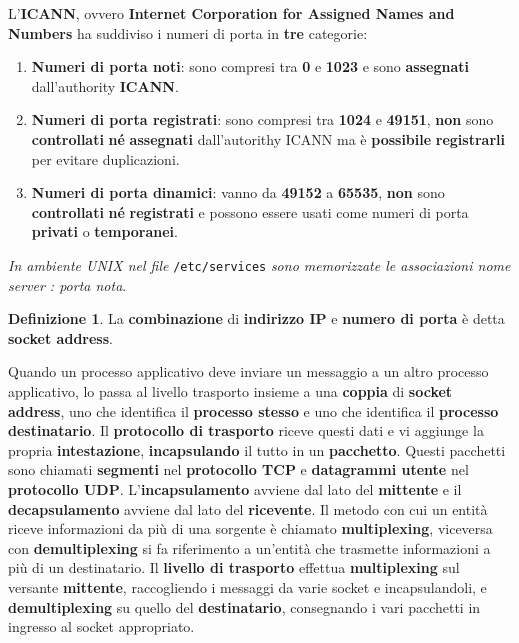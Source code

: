 \documentclass[11pt,a4paper,oneside]{book}
\theoremstyle{definition}
\newtheorem{definition}{Definizione}[section]
\begin{document}
\pagebreak

L'\textbf{ICANN}, ovvero \textbf{Internet Corporation for Assigned Names and Numbers} ha suddiviso i numeri di porta in \textbf{tre} categorie:
\begin{enumerate}
	\item \textbf{Numeri di porta noti}: sono compresi tra \textbf{0} e \textbf{1023} e sono \textbf{assegnati} dall'authority \textbf{ICANN}.
	\item \textbf{Numeri di porta registrati}: sono compresi tra \textbf{1024} e \textbf{49151}, \textbf{non} sono \textbf{controllati} \textbf{né} \textbf{assegnati} dall'autorithy ICANN ma è \textbf{possibile} \textbf{registrarli} per evitare duplicazioni.
	\item \textbf{Numeri di porta dinamici}: vanno da \textbf{49152} a \textbf{65535}, \textbf{non} sono \textbf{controllati} \textbf{né} \textbf{registrati} e possono essere usati come numeri di porta \textbf{privati} o \textbf{temporanei}.
\end{enumerate}
\textit{In ambiente UNIX nel file} \texttt{/etc/services} \textit{sono memorizzate le associazioni nome server : porta nota}.
\theoremstyle{definition}
\begin{definition}
	La \textbf{combinazione} di \textbf{indirizzo IP} e \textbf{numero di porta} è detta \textbf{socket address}.
\end{definition}
Quando un processo applicativo deve inviare un messaggio a un altro processo applicativo, lo passa al livello trasporto insieme a una \textbf{coppia} di \textbf{socket address}, uno che identifica il \textbf{processo stesso} e uno che identifica il \textbf{processo destinatario}. Il \textbf{protocollo di trasporto} riceve questi dati e vi aggiunge la propria \textbf{intestazione}, \textbf{incapsulando} il tutto in un \textbf{pacchetto}. Questi pacchetti sono chiamati \textbf{segmenti} nel \textbf{protocollo TCP} e \textbf{datagrammi utente} nel \textbf{protocollo UDP}. L'\textbf{incapsulamento} avviene dal lato del \textbf{mittente} e il \textbf{decapsulamento} avviene dal lato del \textbf{ricevente}.
\newline\newline
Il metodo con cui un entità riceve informazioni da più di una sorgente è chiamato \textbf{multiplexing}, viceversa con \textbf{demultiplexing} si fa riferimento a un'entità che trasmette informazioni a più di un destinatario. Il \textbf{livello di trasporto} effettua \textbf{multiplexing} sul versante \textbf{mittente}, raccogliendo i messaggi da varie socket e incapsulandoli, e \textbf{demultiplexing} su quello del \textbf{destinatario}, consegnando i vari pacchetti in ingresso al socket appropriato.
\end{document}
